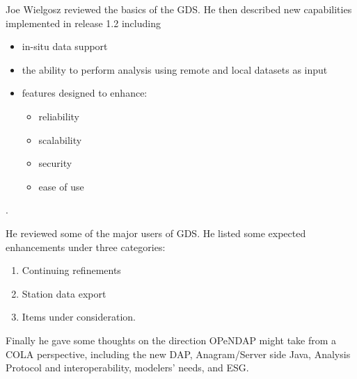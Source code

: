 Joe Wielgosz reviewed the basics of the \ac{GDS}. He then
described new capabilities implemented in release 1.2 including

\begin{itemize}
  \item in-situ data support
  \item the ability to perform analysis using remote and local
        datasets as input
  \item features designed to enhance:

    \begin{itemize}
      \item reliability
      \item scalability
      \item security
      \item ease of use
    \end{itemize}

\end{itemize}.

He reviewed some of the major users of \ac{GDS}.  He listed some 
expected enhancements under three categories:

\begin{enumerate}
  \item Continuing refinements
  \item Station data export
  \item Items under consideration.
\end{enumerate}

Finally he gave some thoughts on the direction \ac{OPeNDAP} might take
from a \ac{COLA} perspective, including the new \ac{DAP}, Anagram/Server
side Java, Analysis Protocol and interoperability, modelers' needs,
and \ac{ESG}.

%
%
%
%

